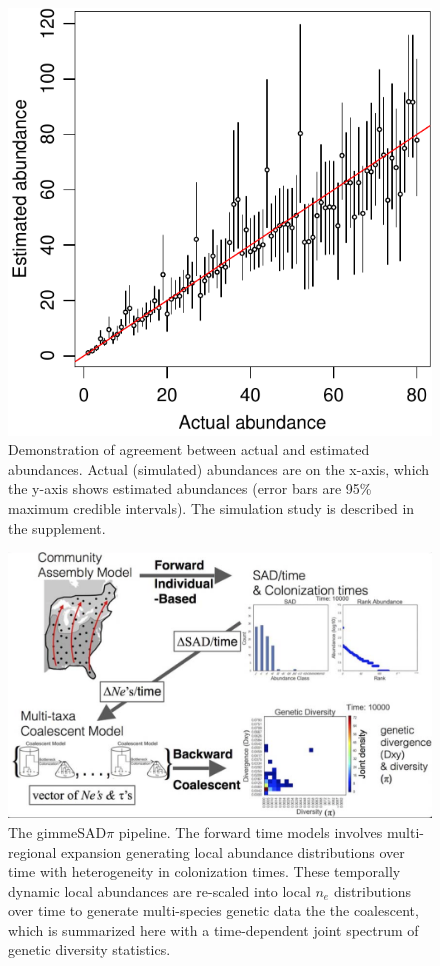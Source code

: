\documentclass[12pt]{article}
\begin{document}
\begin{figure}[!hbp]
  \centering
  \includegraphics[scale=1]{fig_abundEst-1.pdf}
  \caption{Demonstration of agreement between actual and estimated
    abundances. Actual (simulated) abundances are on the x-axis, which
    the y-axis shows estimated abundances (error bars are 95\% maximum
    credible intervals). The simulation study is described in the
    supplement.}
  \label{fig:abundEst}
\end{figure}

\begin{figure}[!hbp]
  \centering
  \includegraphics[scale=0.4]{fig_gimmeSAD.png}
  \caption{The gimmeSAD$\pi$ pipeline. The forward time models
    involves multi-regional expansion generating local abundance
    distributions over time with heterogeneity in
    colonization times. These temporally dynamic local abundances are
    re-scaled into local $n_e$ distributions over time to generate
    multi-species genetic data the the coalescent, which is summarized
    here with a time-dependent joint spectrum of genetic diversity
    statistics.}
  \label{fig:gimmeSAD}
\end{figure}
\end{document}
